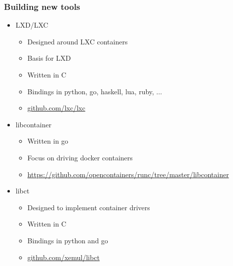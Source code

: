 \documentclass{beamer}
\begin{document}
\begin{frame}
\frametitle{Building new tools}
\begin{itemize}
\item LXD/LXC
  \begin{itemize}
  \item Designed around LXC containers
  \item Basis for LXD
  \item Written in C
  \item Bindings in python, go, haskell, lua, ruby, $\ldots$
  \item \url{github.com/lxc/lxc}
  \end{itemize}
\item libcontainer
  \begin{itemize}
  \item Written in go
  \item Focus on driving docker containers
  \item \url{https://github.com/opencontainers/runc/tree/master/libcontainer}
  \end{itemize}
\item libct
  \begin{itemize}
  \item Designed to implement container drivers
  \item Written in C
  \item Bindings in python and go
  \item \url{github.com/xemul/libct}
  \end{itemize}
\end{itemize}
\end{frame}


\end{document}
